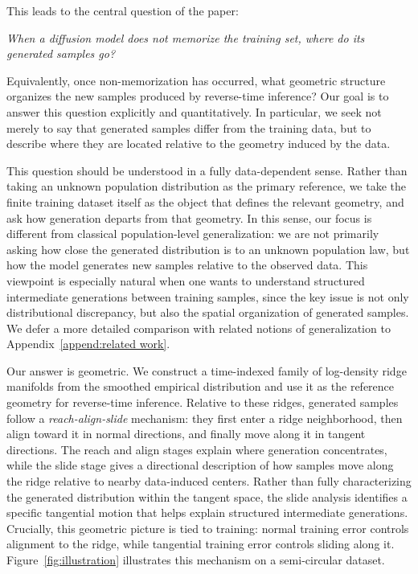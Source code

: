 \documentclass[11pt]{article}
\begin{document}
This leads to the central question of the paper: 
\begin{center}
    \emph{When a diffusion model does not memorize the training set, where do its generated samples go?} 
\end{center}
Equivalently, once non-memorization has occurred, what geometric structure organizes the new samples produced by reverse-time inference? Our goal is to answer this question explicitly and quantitatively. In particular, we seek not merely to say that generated samples differ from the training data, but to describe where they are located relative to the geometry induced by the data.

This question should be understood in a fully data-dependent sense. Rather than taking an unknown population distribution as the primary reference, we take the finite training dataset itself as the object that defines the relevant geometry, and ask how generation departs from that geometry. In this sense, our focus is different from classical population-level generalization: we are not primarily asking how close the generated distribution is to an unknown population law, but how the model generates new samples relative to the observed data. This viewpoint is especially natural when one wants to understand structured intermediate generations between training samples, since the key issue is not only distributional discrepancy, but also the spatial organization of generated samples. We defer a more detailed comparison with related notions of generalization to Appendix~\ref{append:related work}.


Our answer is geometric. We construct a time-indexed family of log-density ridge manifolds from the smoothed empirical distribution and use it as the reference geometry for reverse-time inference. Relative to these ridges, generated samples follow a \emph{reach-align-slide} mechanism: they first enter a ridge neighborhood, then align toward it in normal directions, and finally move along it in tangent directions. The reach and align stages explain where generation concentrates, while the slide stage gives a directional description of how samples move along the ridge relative to nearby data-induced centers. Rather than fully characterizing the generated distribution within the tangent space, the slide analysis identifies a specific tangential motion that helps explain structured intermediate generations. Crucially, this geometric picture is tied to training: normal training error controls alignment to the ridge, while tangential training error controls sliding along it. Figure~\ref{fig:illustration} illustrates this mechanism on a semi-circular dataset.
\end{document}
